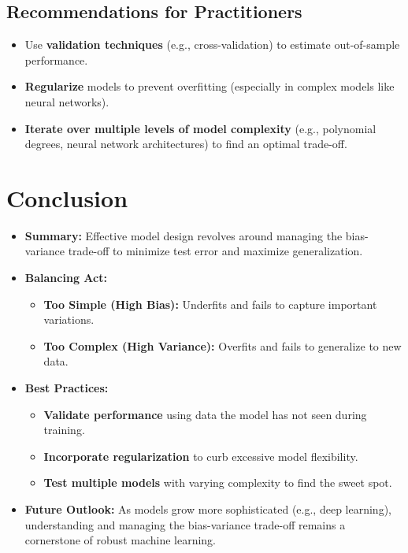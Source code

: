 \documentclass{article}
\begin{document}
\subsection{Recommendations for Practitioners}
\begin{itemize}
    \item Use \textbf{validation techniques} (e.g., cross-validation) to estimate out-of-sample performance.
    \item \textbf{Regularize} models to prevent overfitting (especially in complex models like neural networks).
    \item \textbf{Iterate over multiple levels of model complexity} (e.g., polynomial degrees, neural network architectures) to find an optimal trade-off.
\end{itemize}

\section{Conclusion}
\begin{itemize}
    \item \textbf{Summary:} Effective model design revolves around managing the bias-variance trade-off to minimize test error and maximize generalization.
    \item \textbf{Balancing Act:}
    \begin{itemize}
        \item \textbf{Too Simple (High Bias):} Underfits and fails to capture important variations.
        \item \textbf{Too Complex (High Variance):} Overfits and fails to generalize to new data.
    \end{itemize}
    \item \textbf{Best Practices:}
    \begin{itemize}
        \item \textbf{Validate performance} using data the model has not seen during training.
        \item \textbf{Incorporate regularization} to curb excessive model flexibility.
        \item \textbf{Test multiple models} with varying complexity to find the sweet spot.
    \end{itemize}
    \item \textbf{Future Outlook:} As models grow more sophisticated (e.g., deep learning), understanding and managing the bias-variance trade-off remains a cornerstone of robust machine learning.
\end{itemize}
\end{document}
